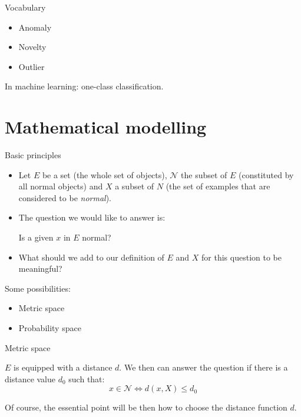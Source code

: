\documentclass[xcolor=pdftex,dvipsnames,table,mathserif]{beamer}
\begin{document}
\begin{frame}{Vocabulary}

  \begin{itemize}
  \item Anomaly
  \item Novelty
  \item Outlier
  \end{itemize}

  In machine learning: one-class classification.
\end{frame}


\section{Mathematical modelling}

\begin{frame}{Basic principles}

  \begin{itemize}
  \item   Let $E$ be a set (the whole set of objects), $\mathcal{N}$ the subset of $E$ (constituted by all normal objects) and $X$ a subset of $N$ (the set of examples that are considered to be \emph{normal}).
  \item The question we would like to answer is:

    \begin{block}{}
      \centering
    Is a given $x$ in $E$ normal?
    \end{block}

    \item What should we add to our definition of $E$ and $X$ for this question to be meaningful?
  \end{itemize}

  Some possibilities:
  \begin{itemize}
  \item Metric space
  \item Probability space
  \end{itemize}

\end{frame}


\begin{frame}{Metric space}

  $E$ is equipped with a distance $d$. We then can answer the question if there is a distance value $d_0$ such that:
  \[
  x \in \mathcal{N} \iff d(x, X) \leq d_0
  \]

  Of course, the essential point will be then how to choose the distance function $d$.

\end{frame}
\end{document}
